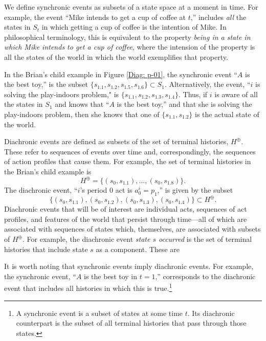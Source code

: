 \documentclass[
11pt,
titlepage,
reqno,
]{article}%
\theoremstyle{definition}
\begin{document}
We define synchronic events as subsets of a state space at a moment in time. 
For example, the event ``Mike intends to get a cup of coffee at $t$,'' includes \textit{all} the states in $S_t$ in which getting a cup of coffee is the intention of Mike. 
In philosophical terminology, this is equivalent to the property \textit{being in a state in which Mike intends to get a cup of coffee}, where the intension of the property is all the states of the world in which the world exemplifies that property.

In the Brian's child example in Figure \ref{Diag: p-01}, the synchronic event ``$A$ is the best toy,'' is the subset $\{s_{1.1},s_{1.2},s_{1.5},s_{1.6}\}\subset S_1$.
Alternatively, the event, ``$i$ is solving the play-indoors problem," is $\{s_{1.1},s_{1.2},s_{1.3},s_{1.4}\}$.
Thus, if $i$ is aware of all the states in $S_1$ and knows that ``$A$ is the best toy,'' and that she is solving the play-indoors problem, then she knows that one of $\{s_{1.1},s_{1.2}\}$ is the actual state of the world.

Diachronic events are defined as subsets of the set of terminal histories, $H^\oplus$.
These refer to sequences of events over time and, correspondingly, the sequences of action profiles that cause them.
For example, the set of terminal histories in the Brian's child example is
\[
	H^\oplus=\{(s_0,s_{1.1}),\ldots,(s_0,s_{1.8})\}.
\]
The diachronic event, ``$i$'s period 0 act is $a^i_0=p_1$,'' is given by the subset
\[
	\{(s_0,s_{1.1}),(s_0,s_{1.2}),(s_0,s_{1.3}),(s_0,s_{1.4})\}\subset H^\oplus.
\] 
Diachronic events that will be of interest are individual acts, sequences of act profiles, and features of the world that persist through time---all of which are associated with sequences of states which, themselves, are associated with subsets of $H^\oplus$.
For example, the diachronic event \textit{state $s$ occurred} is the set of terminal histories that include state $s$ as a component.
These are 

It is worth noting that synchronic events imply diachronic events.
For example, the synchronic event, ``$A$ is the best toy in $t=1$,'' corresponds to the diachronic event that includes all histories in which this is true.\footnote
{
	A synchronic event is a subset of states at some time $t$. Its diachronic counterpart is the subset of all terminal histories that pass through those states.
}


	
\end{document}
